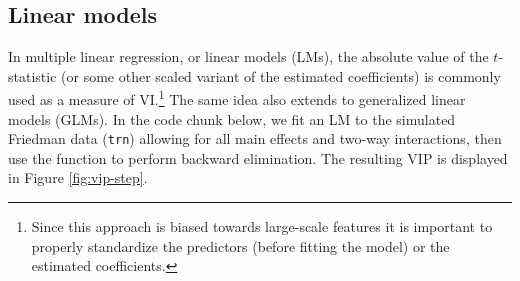 \hypertarget{linear-models}{%
\subsection{Linear models}\label{linear-models}}

In multiple linear regression, or linear models (LMs), the absolute
value of the \(t\)-statistic (or some other scaled variant of the
estimated coefficients) is commonly used as a measure of VI.\footnote{Since
  this approach is biased towards large-scale features it is important
  to properly standardize the predictors (before fitting the model) or
  the estimated coefficients.} The same idea also extends to generalized
linear models (GLMs). In the code chunk below, we fit an LM to the
simulated Friedman data (\texttt{trn}) allowing for all main effects and
two-way interactions, then use the  function to perform
backward elimination. The resulting VIP is displayed in Figure
\ref{fig:vip-step}.

